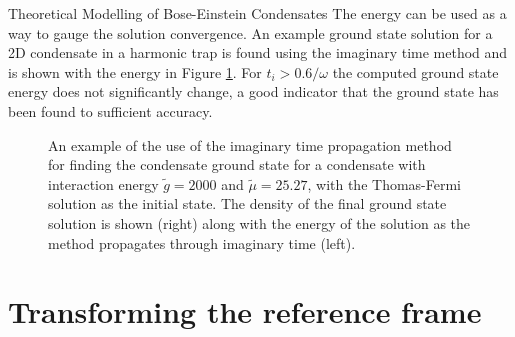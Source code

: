 \begin{chapter}{\label{cha:theoretical_model}Theoretical Modelling of Bose-Einstein Condensates}
The energy can be used as a way to gauge the solution convergence. An example ground state solution for a 2D condensate in a harmonic trap is found using the imaginary time method and is shown with the energy in Figure \ref{fig_imagtimesolgs}. For $t_i > 0.6/\omega$ the computed ground state energy does not significantly change, a good indicator that the ground state has been found to sufficient accuracy.
\begin{figure}
	\centering
  \hspace{0.04\linewidth}
	\caption{An example of the use of the imaginary time propagation method for finding the condensate ground state for a condensate with interaction energy $\tilde{g}=2000$ and $\tilde{\mu}=25.27$, with the Thomas-Fermi solution as the initial state. The density of the final ground state solution is shown (right) along with the energy of the solution as the method propagates through imaginary time (left).}\label{fig_imagtimesolgs}
\end{figure}

\section{\label{section:movframe} Transforming the reference frame}

\end{chapter}

